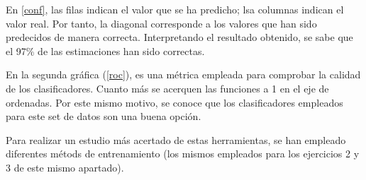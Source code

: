 \documentclass{article}
\begin{document}
En \hyperref[conf]{\ref{conf}}, las filas indican el valor que se ha predicho;
lsa columnas indican el valor real. Por tanto, la diagonal corresponde a los
valores que han sido predecidos de manera correcta. Interpretando el resultado
obtenido, se sabe que el 97\% de las estimaciones han sido correctas.

En la segunda gráfica (\hyperref[roc]{\ref{roc}}), es una métrica empleada para
comprobar la calidad de los clasificadores. Cuanto más se acerquen las funciones
a 1 en el eje de ordenadas. Por este mismo motivo, se conoce que los
clasificadores empleados para este set de datos son una buena opción.

Para realizar un estudio más acertado de estas herramientas, se han empleado
diferentes métods de entrenamiento (los mismos empleados para los ejercicios 2 y
3 de este mismo apartado).
\end{document}
